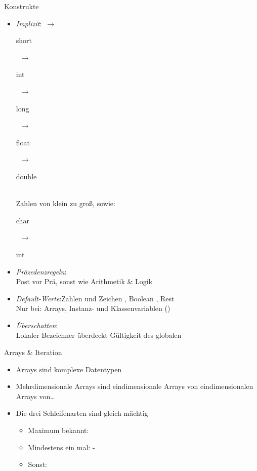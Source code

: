 {\def\mto{\ensuremath{\to}}
\def\dt#1{{\textcolor{paletteA!58!white}{\sbseries\strut#1}}}
\begin{frame}[c]{Konstrukte}
\begin{itemize}[<+(1)->]
   \itemsep18pt
   \item \textit{Implizit}:\quad\pause \dt{byte}~\mto~\dt{short}~\mto~\dt{int}~\mto~\dt{long}~\mto~\dt{float}~\mto~\dt{double}\\
   Zahlen von klein zu groß, sowie: \dt{char}~\mto~\dt{int}
   \item \textit{Präzedenzregeln}:\pause\\
   Post vor Prä, sonst wie Arithmetik \& Logik
   \item \textit{Default-Werte}:\quad\pause Zahlen und Zeichen , Boolean , Rest \pause\\
   Nur bei: Arrays, Instanz- und Klassenvariablen ()
   \item \textit{Überschatten}:\pause\\
   Lokaler Bezeichner überdeckt Gültigkeit des globalen
\end{itemize}
\end{frame}

\def\mto{\ensuremath{\to}}
\begin{frame}[c]{Arrays \& Iteration}
\begin{itemize}[<+(1)->]
   \itemsep18pt
   \item Arrays sind komplexe Datentypen
   \item Mehrdimensionale Arrays sind eindimensionale Arrays von eindimensionalen Arrays von\ldots
   \item Die drei Schleifenarten sind gleich mächtig \begin{itemize}
      \item Maximum bekannt: 
      \item Mindestens ein mal: -
      \item Sonst: 
   \end{itemize}
\end{itemize}
\end{frame}

}
